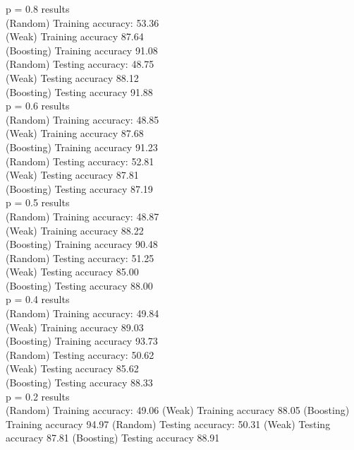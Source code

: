 p = 0.8 results \\
(Random) Training accuracy: 53.36 \\
(Weak) Training accuracy 87.64 \\
(Boosting) Training accuracy 91.08 \\
(Random) Testing accuracy: 48.75 \\
(Weak) Testing accuracy 88.12 \\
(Boosting) Testing accuracy 91.88 \\

p = 0.6 results \\
(Random) Training accuracy: 48.85 \\
(Weak) Training accuracy 87.68 \\
(Boosting) Training accuracy 91.23 \\
(Random) Testing accuracy: 52.81 \\
(Weak) Testing accuracy 87.81 \\
(Boosting) Testing accuracy 87.19 \\

p = 0.5 results \\

(Random) Training accuracy: 48.87 \\
(Weak) Training accuracy 88.22 \\
(Boosting) Training accuracy 90.48 \\
(Random) Testing accuracy: 51.25 \\
(Weak) Testing accuracy 85.00 \\
(Boosting) Testing accuracy 88.00 \\

p = 0.4 results \\
(Random) Training accuracy: 49.84 \\
(Weak) Training accuracy 89.03 \\
(Boosting) Training accuracy 93.73 \\
(Random) Testing accuracy: 50.62 \\
(Weak) Testing accuracy 85.62 \\
(Boosting) Testing accuracy 88.33 \\

p = 0.2 results \\
(Random) Training accuracy: 49.06
(Weak) Training accuracy 88.05
(Boosting) Training accuracy 94.97
(Random) Testing accuracy: 50.31
(Weak) Testing accuracy 87.81
(Boosting) Testing accuracy 88.91


